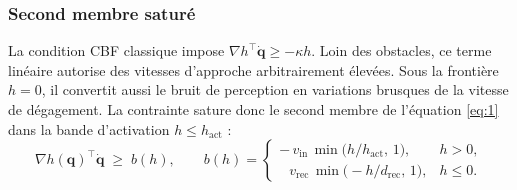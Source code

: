 \subsubsection{Second membre saturé}
La condition \ac{CBF} classique impose $\nabla h^\top\dot{\mathbf{q}}\geq-\kappa h$. Loin des obstacles, ce terme linéaire autorise des vitesses d'approche arbitrairement élevées. Sous la frontière $h=0$, il convertit aussi le bruit de perception en variations brusques de la vitesse de dégagement. La contrainte sature donc le second membre de l'équation \eqref{eq:1} dans la bande d'activation $h\leq h_{\mathrm{act}}$ :
\begin{equation} \label{eq:1}
\nabla h(\mathbf{q})^{\top}\dot{\mathbf{q}} \;\geq\; b(h),
\qquad
b(h) =
\begin{cases}
-\,v_{\mathrm{in}}\,\min\!\big(h/h_{\mathrm{act}},\,1\big), & h > 0,\\[4pt]
\;\;\,v_{\mathrm{rec}}\,\min\!\big(-h/d_{\mathrm{rec}},\,1\big), & h \leq 0.
\end{cases}
\end{equation}
